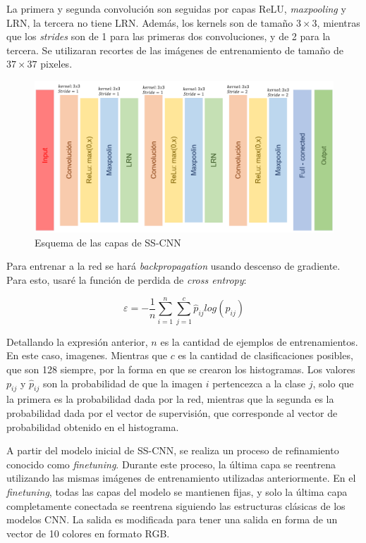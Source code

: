 \documentclass[14pt,a4paper]{report}
\begin{document}
La primera y segunda convolución son seguidas por capas ReLU, \textit{maxpooling} y LRN, la tercera no tiene LRN. Además, los kernels son de tamaño $3\times3$, mientras que los \textit{strides} son de 1 para las primeras dos convoluciones, y de 2 para la tercera. Se utilizaran recortes de las imágenes de entrenamiento de tamaño de $37\times 37$ pixeles.

\begin{figure}[h]
  \centering
\includegraphics[scale=0.5]{../esquema-capas.png} 
  \caption{Esquema de las capas de SS-CNN}
  \label{fig:neural-network}
\end{figure}

Para entrenar a la red se hará \textit{backpropagation} usando descenso de gradiente. Para esto, usaré la función de perdida de \textit{cross entropy}:

$$
\varepsilon = -\frac{1}{n}\sum^{n}_{i=1}\sum^{c}_{j=1}\hat{p}_{ij}log(p_{ij})
$$

Detallando la expresión anterior, $n$ es la cantidad de ejemplos de entrenamientos. En este caso, imagenes. Mientras que $c$ es la cantidad de clasificaciones posibles, que son 128 siempre, por la forma en que se crearon los histogramas. Los valores $p_{ij}$ y $\hat{p}_{ij}$ son la probabilidad de que la imagen $i$ pertencezca a la clase $j$, solo que la primera es la probabilidad dada por la red, mientras que la segunda es la probabilidad dada por el vector de supervisión, que corresponde al vector de probabilidad obtenido en el histograma.

A partir del modelo inicial de SS-CNN, se realiza un proceso de refinamiento conocido como \textit{finetuning}. Durante este proceso, la última capa se reentrena utilizando las mismas imágenes de entrenamiento utilizadas anteriormente. En el \textit{finetuning}, todas las capas del modelo se mantienen fijas, y solo la última capa completamente conectada se reentrena siguiendo las estructuras clásicas de los modelos CNN. La salida es modificada para tener una salida en forma de un vector de 10 colores en formato RGB.
\end{document}
